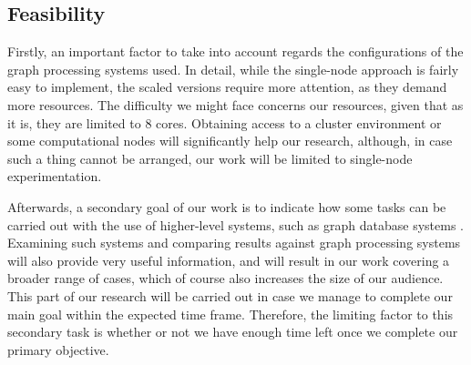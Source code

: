 \documentclass[a4paper,11pt]{article}
\begin{document}
\subsection{Feasibility} \label{feasibility}

\par Firstly, an important factor to take into account regards the configurations of the graph processing systems used. In detail, while the single-node approach is fairly easy to implement, the scaled versions require more attention, as they demand more resources. The difficulty we might face concerns our resources, given that as it is, they are limited to 8 cores. Obtaining access to a cluster environment or some computational nodes will significantly help our research, although, in case such a thing cannot be arranged, our work will be limited to single-node experimentation.

\par Afterwards, a secondary goal of our work is to indicate how some tasks can be carried out with the use of higher-level systems, such as graph database systems \cite{emptyheaded, emptyheadedgit, neo4j}.  Examining such systems and comparing results against graph processing systems will also provide very useful information, and will result in our work covering a broader range of cases, which of course also increases the size of our audience. This part of our research will be carried out in case we manage to complete our main goal within the expected time frame. Therefore, the limiting factor to this secondary task is whether or not we have enough time left once we complete our primary objective.



\end{document}
